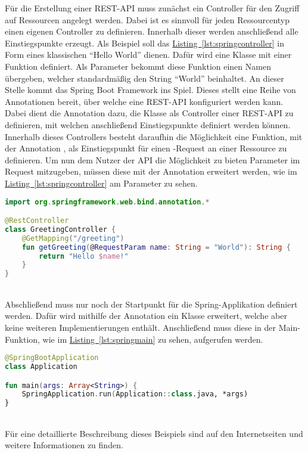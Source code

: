 Für die Erstellung einer \gls{REST}-\gls{API} muss zunächst ein Controller für den Zugriff auf Ressourcen angelegt werden. Dabei ist es sinnvoll für jeden Ressourcentyp einen eigenen Controller zu definieren. Innerhalb dieser werden anschließend alle Einstiegspunkte erzeugt. Als Beispiel soll das \hyperref[lst:springcontroller]{Listing~\ref{lst:springcontroller}} in Form eines klassischen \enquote{Hello World} dienen. Dafür wird eine Klasse  mit einer Funktion  definiert. Als Parameter bekommt diese Funktion einen Namen übergeben, welcher standardmäßig den String \enquote{World} beinhaltet. An dieser Stelle kommt das Spring Boot Framework ins Spiel. Dieses stellt eine Reihe von Annotationen bereit, über welche eine \gls{REST}-\gls{API} konfiguriert werden kann. Dabei dient die Annotation  dazu, die Klasse  als Controller einer \gls{REST}-\gls{API} zu definieren, mit welchen anschließend Einstiegspunkte definiert werden können. Innerhalb dieses Controllers besteht daraufhin die Möglichkeit eine Funktion, mit der Annotation , als Einstiegspunkt für einen -Request an einer Ressource zu definieren. Um nun dem Nutzer der \gls{API} die Möglichkeit zu bieten Parameter im Request mitzugeben, müssen diese mit der Annotation  erweitert werden, wie im \hyperref[lst:springcontroller]{Listing~\ref{lst:springcontroller}} am Parameter  zu sehen.\\
\begin{lstlisting}[style=lstStyleFramed, language=Kotlin, caption={Beispiel: Spring Controller}, label=lst:springcontroller, float]
import org.springframework.web.bind.annotation.*

@RestController
class GreetingController {
	@GetMapping("/greeting")
	fun getGreeting(@RequestParam name: String = "World"): String {
		return "Hello $name!"
	}
}
\end{lstlisting}
\\
Abschließend muss nur noch der Startpunkt für die Spring-Applikation definiert werden. Dafür wird mithilfe der Annotation  ein Klasse erweitert, welche aber keine weiteren Implementierungen enthält. Anschließend muss diese in der Main-Funktion, wie im \hyperref[lst:springmain]{Listing~\ref{lst:springmain}} zu sehen, aufgerufen werden.
\\
\begin{lstlisting}[style=lstStyleFramed, language=Kotlin, caption={Beispiel: Spring Application Class}, label=lst:springmain, float]
@SpringBootApplication
class Application

fun main(args: Array<String>) {
	SpringApplication.run(Application::class.java, *args)
}
\end{lstlisting}
\\
Für eine detaillierte Beschreibung dieses Beispiels sind auf den Internetseiten \cite{springTutorialKotlin} und \cite{springTutorial} weitere Informationen zu finden.

